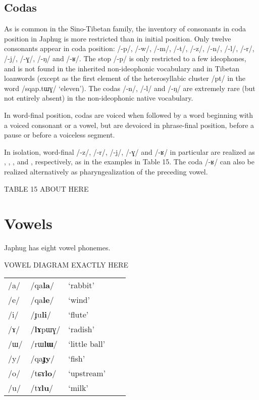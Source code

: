 \documentclass[12pt]{article}
\newcommand{\ipa}[1]{\mbox{\phon/#1/}}
\newcommand{\phonet}[1]{\mbox{\phon[#1]}}
\begin{document}
 \subsection*{Codas} \label{sec:coda}
   As is common in the Sino-Tibetan family, the inventory of consonants in coda position in Japhug is more restricted than in initial position.  Only twelve   consonants appear in coda position:  \ipa{-p}, \ipa{-w}, \ipa{-m}, \ipa{-t}, \ipa{-z}, \ipa{-n}, \ipa{-l}, \ipa{-r}, \ipa{-j}, \ipa{-ɣ}, \ipa{-ŋ} and \ipa{-ʁ}. The stop \ipa{-p} is only restricted to a few ideophones, and is not found in the inherited non-ideophonic vocabulary and in Tibetan loanwords (except as the first element of the heterosyllabic cluster \ipa{pt} in the word \ipa{sqap.tɯɣ} `eleven'). The codas \ipa{-n}, \ipa{-l} and \ipa{-ŋ} are extremely rare (but not entirely absent) in the non-ideophonic native vocabulary. 
    
In word-final position, codas are voiced when followed by a word beginning with a voiced consonant or a vowel, but are devoiced in phrase-final position, before a pause or before a voiceless segment.

In isolation, word-final \ipa{-z}, \ipa{-r}, \ipa{-j}, \ipa{-ɣ} and \ipa{-ʁ} in particular are realized as \phonet{s}, \phonet{r̥}, \phonet{j̥}, \phonet{x} and \phonet{χ}, respectively, as in the examples in Table 15. The coda \ipa{-ʁ} can also be realized alternatively as pharyngealization of the preceding vowel.

TABLE 15 ABOUT HERE     
   
 \section*{Vowels} \label{sec:vowels}

Japhug has eight vowel phonemes. 

VOWEL DIAGRAM EXACTLY HERE

\begin{table}[H]
\begin{tabular}{lllll}
\ipa{a} & \ipa{qa\textbf{la}} & `rabbit' \\
\ipa{e} & \ipa{qa\textbf{le}} & `wind' \\
\ipa{i} & \ipa{ɟu\textbf{li}} & `flute' \\
\ipa{ɤ} & \ipa{\textbf{lɤ}pɯɣ} & `radish' \\
\ipa{ɯ} & \ipa{rɯ\textbf{lɯ}} & `little ball' \\
\ipa{y} & \ipa{qa\textbf{ɟy}} & `fish' \\
\ipa{o} & \ipa{tɕɤ\textbf{lo}} & `upstream' \\
\ipa{u} & \ipa{tɤ\textbf{lu}} & `milk' \\
\end{tabular}
\end{table}
\end{document}
